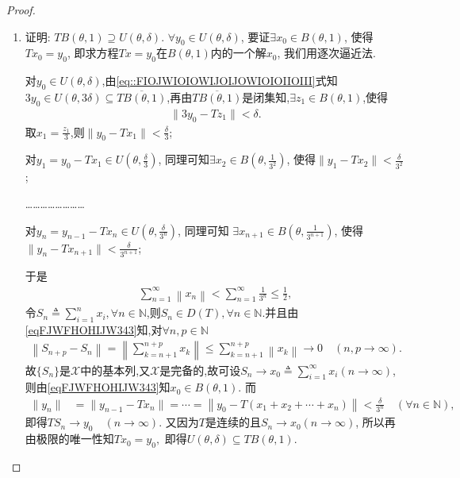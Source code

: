 \documentclass[../../main.tex]{subfiles}%
\begin{document}
\begin{proof}
\begin{enumerate}[(1)]
\item 证明: $TB(\theta,1)\supseteq U(\theta,\delta)$. $\forall y_0\in U(\theta,\delta)$, 要证$\exists x_0\in B(\theta,1)$, 使得$Tx_0=y_0$, 即求方程$Tx=y_0$在$B(\theta,1)$内的一个解$x_0$, 我们用逐次逼近法.

对$y_0\in U(\theta,\delta)$,由\eqref{eq::FIOJWIOIOWIJOIJOWIOIOIIOIII}式知$3y_0\in U(\theta,3\delta)\subseteq \overline{TB(\theta,1)}$,再由$\overline{TB(\theta,1)}$是闭集知,$\exists z_1\in B(\theta,1)$,使得
\begin{align*}
\|3y_0-Tz_1\|<\delta.
\end{align*}
取$x_1=\frac{z_1}{3}$,则$\|y_0-Tx_1\|<\frac{\delta}{3}$;

对$y_1=y_0-Tx_1\in U\left(\theta,\frac{\delta}{3}\right)$, 同理可知$\exists x_2\in B\left(\theta,\frac{1}{3^2}\right)$, 使得$\|y_1-Tx_2\|<\frac{\delta}{3^2}$;

……………………

对$y_n=y_{n-1}-Tx_n\in U\left(\theta,\frac{\delta}{3^n}\right)$, 同理可知 $\exists x_{n+1}\in B\left(\theta,\frac{1}{3^{n+1}}\right)$, 使得$\|y_n-Tx_{n+1}\|<\frac{\delta}{3^{n+1}}$;

于是
\begin{align}\label{eqFJWFHOHIJW343}
\sum_{n=1}^{\infty}{\left\| x_n \right\|}<\sum_{n=1}^{\infty}{\frac{1}{3^n}}\leqslant \frac{1}{2},
\end{align}
令$S_n\triangleq\sum\limits_{i=1}^{n}x_i,\forall n\in\mathbb{N}$,则$S_n\in D(T),\forall n\in \mathbb{N}$.并且由\eqref{eqFJWFHOHIJW343}知,对$\forall n,p\in \mathbb{N}$
\begin{align*}
\left\| S_{n+p}-S_n \right\| =\left\| \sum_{k=n+1}^{n+p}{x_k} \right\| \leqslant \sum_{k=n+1}^{n+p}{\left\| x_k \right\|}\rightarrow 0\quad \left( n,p\rightarrow \infty \right) .
\end{align*}
故$\{S_n\}$是$\mathscr{X}$中的基本列,又$\mathscr{X}$是完备的,故可设$S_n\to x_0\triangleq\sum\limits_{i=1}^{\infty}x_i(n\to\infty)$,则由\eqref{eqFJWFHOHIJW343}知$x_0\in B(\theta,1)$.
而
\begin{align*}
\|y_n\|&=\|y_{n-1}-Tx_n\|=\cdots=\left\|y_0-T(x_1+x_2+\cdots+x_n)\right\|<\frac{\delta}{3^n}\quad(\forall n\in\mathbb{N}),
\end{align*}
即得$TS_n\to y_0\quad(n\to\infty).$
又因为$T$是连续的且$S_n\to x_0(n\to\infty)$, 所以再由极限的唯一性知$Tx_0=y_0,$
即得$U(\theta,\delta)\subseteq TB(\theta,1)$.
\end{enumerate}

\end{proof}
\end{document}
